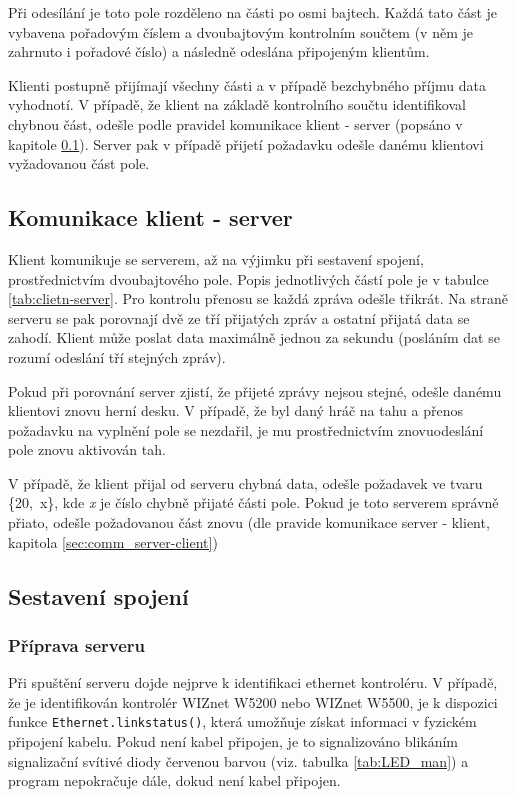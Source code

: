 Při odesílání je toto pole rozděleno na části po osmi bajtech. Každá tato část je vybavena pořadovým číslem a dvoubajtovým kontrolním součtem (v něm je zahrnuto i pořadové číslo) a následně odeslána připojeným klientům.

Klienti postupně přijímají všechny části a v případě bezchybného příjmu data vyhodnotí. V případě, že klient na základě kontrolního součtu identifikoval chybnou část, odešle podle pravidel komunikace klient - server (popsáno v kapitole \ref{sec:comm_client-server}). Server pak v případě přijetí požadavku odešle danému klientovi vyžadovanou část pole.


\subsection{Komunikace klient - server}
\label{sec:comm_client-server}
Klient komunikuje se serverem, až na výjimku při sestavení spojení, prostřednictvím dvoubajtového pole. Popis jednotlivých částí pole je v tabulce \ref{tab:clietn-server}. Pro kontrolu přenosu se každá zpráva odešle třikrát. Na straně serveru se pak porovnají dvě ze tří přijatých zpráv a ostatní přijatá data se zahodí. Klient může poslat data maximálně jednou za sekundu (posláním dat se rozumí odeslání tří stejných zpráv).

Pokud při porovnání server zjistí, že přijeté zprávy nejsou stejné, odešle danému klientovi znovu herní desku. V případě, že byl daný hráč na tahu a přenos požadavku na vyplnění pole se nezdařil, je mu prostřednictvím znovuodeslání pole znovu aktivován tah.

V případě, že klient přijal od serveru chybná data, odešle požadavek ve tvaru \mbox{\{20, x\}}, kde \textit{x} je číslo chybně přijaté části pole. Pokud je toto serverem správně přiato, odešle požadovanou část znovu (dle pravide komunikace server - klient, kapitola \ref{sec:comm_server-client})





\newpage
\subsection{Sestavení spojení}
\subsubsection{Příprava serveru}
Při spuštění serveru dojde nejprve k identifikaci ethernet kontroléru. V případě, že je identifikován kontrolér WIZnet W5200 nebo WIZnet W5500, je k dispozici funkce \texttt{Ethernet.linkstatus()}, která umožňuje získat informaci v fyzickém připojení kabelu. Pokud není kabel připojen, je to signalizováno blikáním signalizační svítivé diody červenou barvou (viz. tabulka \ref{tab:LED_man}) a program nepokračuje dále, dokud není kabel připojen.

